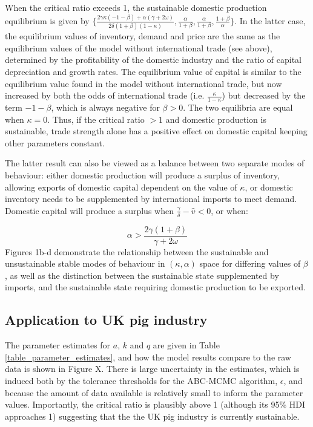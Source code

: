 \documentclass[12pt]{article}
\begin{document}
When the critical ratio exceeds 1, the sustainable domestic production equilibrium is given by $\{\frac{2 \gamma \kappa (- 1 - \beta) + \alpha (\gamma + 2 \omega)}{2 \delta (1+\beta)(1 - \kappa) }, \frac{\alpha}{1 + \beta}, \frac{\alpha}{1 + \beta}, \frac{1 + \beta}{\alpha}\}$. In the latter case, the equilibrium values of inventory, demand and price are the same as the equilibrium values of the model without international trade (see above), determined by the profitability of the domestic industry and the ratio of capital depreciation and growth rates. The equilibrium value of capital is similar to the equilibrium value found in the model without international trade, but now increased by both the odds of international trade (i.e. $\frac{\kappa}{1-\kappa}$) but decreased by the term $ - 1 - \beta$, which is always negative for $\beta > 0$.
The two equilibria are equal when $\kappa = 0$. Thus, if the critical ratio $> 1$ and domestic production is sustainable, trade strength alone has a positive effect on domestic capital keeping other parameters constant.

The latter result can also be viewed as a balance between two separate modes of behaviour: either domestic production will produce a surplus of inventory, allowing exports of domestic capital dependent on the value of $\kappa$, or domestic inventory needs to be supplemented by international imports to meet demand. Domestic capital will produce a surplus when $\frac{\gamma}{\delta} - \hat{v} < 0$, or when:

\begin{equation}
  \alpha > \frac{2 \gamma (1 + \beta)}{\gamma + 2 \omega}
\end{equation}
%
Figures 1b-d demonstrate the relationship between the sustainable and unsustainable stable modes of behaviour in $(\kappa, \alpha)$ space for differing values of $\beta$, as well as the distinction between the sustainable state supplemented by imports, and the sustainable state requiring domestic production to be exported.

\subsection{Application to UK pig industry}
The parameter estimates for $a$, $k$ and $q$ are given in Table \ref{table_parameter_estimates}, and how the model results compare to the raw data is shown in Figure X. There is large uncertainty in the estimates, which is induced both by the tolerance thresholds for the ABC-MCMC algorithm, $\epsilon$, and because the amount of data available is relatively small to inform the parameter values. Importantly, the critical ratio is plausibly above 1 (although its 95\% HDI approaches 1) suggesting that the the UK pig industry is currently sustainable.
\end{document}
